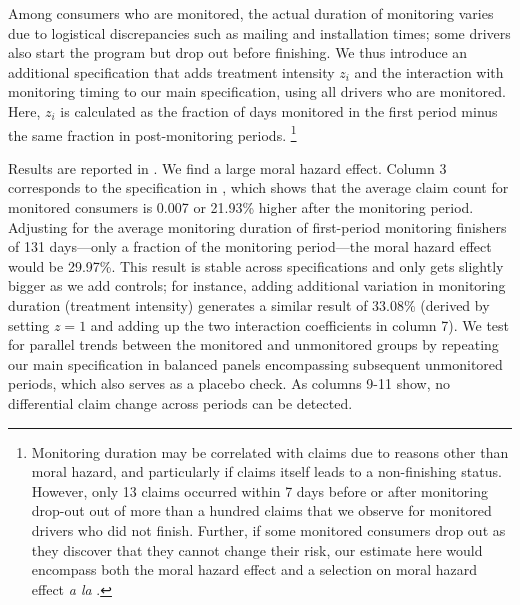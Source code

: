
Among consumers who are monitored, the actual duration of monitoring varies due to logistical discrepancies such as mailing and installation times; some drivers also start the program but drop out before finishing.
We thus introduce an additional specification that adds treatment intensity $z_{i}$ and the interaction with monitoring timing to our main specification, using all drivers who are monitored. Here, $z_{i}$ is calculated as the fraction of days monitored in the first period minus the same fraction in post-monitoring periods. \footnote{Monitoring duration may be correlated with claims due to reasons other than moral hazard, and particularly if claims itself leads to a non-finishing status. However, only 13 claims occurred within 7 days before or after monitoring drop-out out of more than a hundred claims that we observe for monitored drivers who did not finish. Further, if some monitored consumers drop out as they discover that they cannot change their risk, our estimate here would encompass both the moral hazard effect and a selection on moral hazard effect \textit{a la} \textcite{Einav2013}.}

Results are reported in
. We find a large moral hazard effect. Column 3 corresponds to the specification in , which shows that the average claim count for monitored consumers is 0.007 or 21.93\% higher after the monitoring period. Adjusting for the average monitoring duration of first-period monitoring finishers of 131 days---only a fraction of the monitoring period---the moral hazard effect would be 29.97\%. This result is stable across specifications and only gets slightly bigger as we add controls; for instance, adding additional variation in monitoring duration (treatment intensity) generates a similar result of 33.08\% (derived by setting $z=1$ and adding up the two interaction coefficients in column 7). We test for parallel trends between the monitored and unmonitored groups by repeating our main specification in balanced panels encompassing subsequent unmonitored periods, which also serves as a placebo check. As columns 9-11 show, no differential claim change across periods can be detected.

